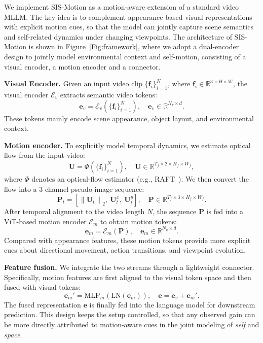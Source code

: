 \documentclass[sigconf, screen, review, anonymous]{acmart}
\begin{document}
We implement SIS-Motion as a motion-aware extension of a standard video MLLM. The key idea is to complement appearance-based visual representations with explicit motion cues, so that the model can jointly capture scene semantics and self-related dynamics under changing viewpoints. The architecture of SIS-Motion is shown in Figure~\ref{Fig:framework}, where we adopt a dual-encoder design to jointly model environmental context and self-motion, consisting of a visual encoder, a motion encoder and a connector.

\noindent \textbf{Visual Encoder.}
Given an input video clip \( \{\mathbf{f}_i\}_{i=1}^{N} \), where \( \mathbf{f}_i\in\mathbb{R}^{3\times H\times W} \), the visual encoder \( \mathcal{E}_{v} \) extracts semantic video tokens:
\[
\mathbf{e}_{v}=\mathcal{E}_{v}(\{\mathbf{f}_i\}_{i=1}^{N}), \quad
\mathbf{e}_{v}\in\mathbb{R}^{N_v\times d}.
\]
These tokens mainly encode scene appearance, object layout, and environmental context.

\noindent\textbf{Motion encoder.}
To explicitly model temporal dynamics, we estimate optical flow from the input video:
\[
\mathbf{U}=\Phi(\{\mathbf{f}_i\}_{i=1}^{N}), \quad
\mathbf{U}\in\mathbb{R}^{T_f\times 2\times H_f\times W_f},
\]
where \( \Phi \) denotes an optical-flow estimator (e.g., RAFT~\cite{teed2020raft}). We then convert the flow into a 3-channel pseudo-image sequence:
\[
\mathbf{P}_t=\left[\left\|\mathbf{U}_t\right\|_2,\ \mathbf{U}_t^{x},\ \mathbf{U}_t^{y}\right], \quad
\mathbf{P}\in\mathbb{R}^{T_f\times 3\times H_f\times W_f}.
\]
After temporal alignment to the video length \(N\), the sequence $\mathbf{P}$ is fed into a ViT-based motion encoder \( \mathcal{E}_m \) to obtain motion tokens:
\[
\mathbf{e}_m=\mathcal{E}_m(\mathbf{P}), \quad
\mathbf{e}_m\in\mathbb{R}^{N_v\times d}.
\]
Compared with appearance features, these motion tokens provide more explicit cues about directional movement, action transitions, and viewpoint evolution.

\noindent\textbf{Feature fusion.}
We integrate the two streams through a lightweight connector. Specifically, motion features are first aligned to the visual token space and then fused with visual tokens:
\[
\mathbf{e}_{m}'=\mathrm{MLP}_{m}(\mathrm{LN}(\mathbf{e}_{m})), \quad
\mathbf{e}=\mathbf{e}_{v}+\mathbf{e}_{m}'.
\]
The fused representation \( \mathbf{e} \) is finally fed into the language model for downstream prediction. This design keeps the setup controlled, so that any observed gain can be more directly attributed to motion-aware cues in the joint modeling of \emph{self} and \emph{space}.
\end{document}
